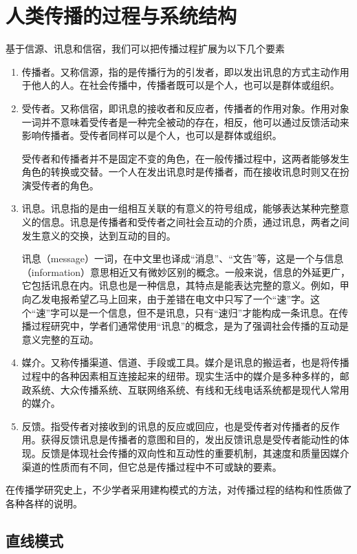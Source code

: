 \documentclass[UTF8,12pt]{ctexart}
\numberwithin{equation}{section} %
\numberwithin{figure}{section}
\numberwithin{table}{section}
\begin{document}
	\section{人类传播的过程与系统结构}
	基于信源、讯息和信宿，我们可以把传播过程扩展为以下几个要素
	\begin{enumerate}
		\item 传播者。又称信源，指的是传播行为的引发者，即以发出讯息的方式主动作用于他人的人。在社会传播中，传播者既可以是个人，也可以是群体或组织。
		
		\item 受传者。又称信宿，即讯息的接收者和反应者，传播者的作用对象。作用对象一词并不意味着受传者是一种完全被动的存在，相反，他可以通过反馈活动来影响传播者。受传者同样可以是个人，也可以是群体或组织。
		
		受传者和传播者并不是固定不变的角色，在一般传播过程中，这两者能够发生角色的转换或交替。一个人在发出讯息时是传播者，而在接收讯息时则又在扮演受传者的角色。
		
		\item 讯息。讯息指的是由一组相互关联的有意义的符号组成，能够表达某种完整意义的信息。讯息是传播者和受传者之间社会互动的介质，通过讯息，两者之间发生意义的交换，达到互动的目的。
		
		讯息（message）一词，在中文里也译成“消息”、“文告”等，这是一个与信息（information）意思相近又有微妙区别的概念。一般来说，信息的外延更广，它包括讯息在内。讯息也是一种信息，其特点是能表达完整的意义。例如，甲向乙发电报希望乙马上回来，由于差错在电文中只写了一个“速”字。这个“速”字可以是一个信息，但不是讯息，只有“速归”才能构成一条讯息。在传播过程研究中，学者们通常使用“讯息”的概念，是为了强调社会传播的互动是意义完整的互动。
		
		\item 媒介。又称传播渠道、信道、手段或工具。媒介是讯息的搬运者，也是将传播过程中的各种因素相互连接起来的纽带。现实生活中的媒介是多种多样的，邮政系统、大众传播系统、互联网络系统、有线和无线电话系统都是现代人常用的媒介。
		
		\item 反馈。指受传者对接收到的讯息的反应或回应，也是受传者对传播者的反作用。获得反馈讯息是传播者的意图和目的，发出反馈讯息是受传者能动性的体现。反馈是体现社会传播的双向性和互动性的重要机制，其速度和质量因媒介渠道的性质而有不同，但它总是传播过程中不可或缺的要素。
	\end{enumerate}
	
	在传播学研究史上，不少学者采用建构模式的方法，对传播过程的结构和性质做了各种各样的说明。
	
	\subsection{直线模式}
		
\end{document}
